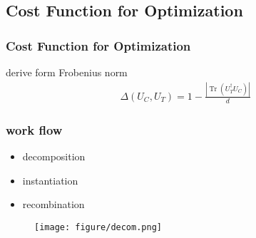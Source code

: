\documentclass[aspectratio=1610]{beamer}
\begin{document}
\subsection{Cost Function for Optimization}
\begin{frame}
\frametitle{Cost Function for Optimization}
derive form Frobenius norm
\begin{align}
  \Delta\left(U_{C}, U_{T}\right)=1-\frac{\left|\operatorname{Tr}\left(U_{T}^{\dagger} U_{C}\right)\right|}{d}
\end{align}
\end{frame}
\begin{frame}
  \frametitle{work flow}
  \begin{itemize}
    \item decomposition
    \item instantiation
    \item recombination
  \end{itemize}
  \begin{figure}
    \texttt{[image: figure/decom.png]}
  \end{figure}
\end{frame}
\end{document}
